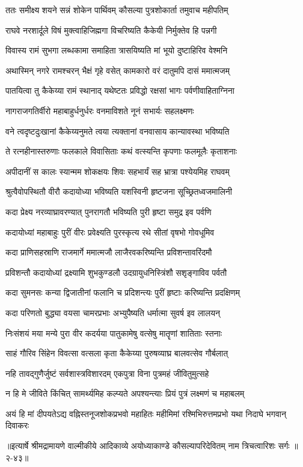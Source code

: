 
\twolineshloka
{ततः समीक्ष्य शयने सन्नं शोकेन पार्थिवम्}
{कौसल्या पुत्रशोकार्ता तमुवाच महीपतिम्} %

\twolineshloka
{राघवे नरशार्दूले विषं मुक्त्वाहिजिह्मगा}
{विचरिष्यति कैकेयी निर्मुक्तेव हि पन्नगी} %

\twolineshloka
{विवास्य रामं सुभगा लब्धकामा समाहिता}
{त्रासयिष्यति मां भूयो दुष्टाहिरिव वेश्मनि} %

\twolineshloka
{अथास्मिन् नगरे रामश्चरन् भैक्षं गृहे वसेत्}
{कामकारो वरं दातुमपि दासं ममात्मजम्} %

\twolineshloka
{पातयित्वा तु कैकेय्या रामं स्थानाद् यथेष्टतः}
{प्रविद्धो रक्षसां भागः पर्वणीवाहिताग्निना} %

\twolineshloka
{नागराजगतिर्वीरो महाबाहुर्धनुर्धरः}
{वनमाविशते नूनं सभार्यः सहलक्ष्मणः} %

\twolineshloka
{वने त्वदृष्टदुःखानां कैकेय्यनुमते त्वया}
{त्यक्तानां वनवासाय कान्यावस्था भविष्यति} %

\twolineshloka
{ते रत्नहीनास्तरुणाः फलकाले विवासिताः}
{कथं वत्स्यन्ति कृपणाः फलमूलैः कृताशनाः} %

\twolineshloka
{अपीदानीं स कालः स्यान्मम शोकक्षयः शिवः}
{सहभार्यं सह भ्रात्रा पश्येयमिह राघवम्} %

\twolineshloka
{श्रुत्वैवोपस्थितौ वीरौ कदायोध्या भविष्यति}
{यशस्विनी हृष्टजना सूच्छ्रितध्वजमालिनी} %

\twolineshloka
{कदा प्रेक्ष्य नरव्याघ्रावरण्यात् पुनरागतौ}
{भविष्यति पुरी हृष्टा समुद्र इव पर्वणि} %

\twolineshloka
{कदायोध्यां महाबाहुः पुरीं वीरः प्रवेक्ष्यति}
{पुरस्कृत्य रथे सीतां वृषभो गोवधूमिव} %

\twolineshloka
{कदा प्राणिसहस्राणि राजमार्गे ममात्मजौ}
{लाजैरवकरिष्यन्ति प्रविशन्तावरिंदमौ} %

\twolineshloka
{प्रविशन्तौ कदायोध्यां द्रक्ष्यामि शुभकुण्डलौ}
{उदग्रायुधनिस्त्रिंशौ सशृङ्गाविव पर्वतौ} %

\twolineshloka
{कदा सुमनसः कन्या द्विजातीनां फलानि च}
{प्रदिशन्त्यः पुरीं हृष्टाः करिष्यन्ति प्रदक्षिणम्} %

\twolineshloka
{कदा परिणतो बुद्ध्या वयसा चामरप्रभाः}
{अभ्युपैष्यति धर्मात्मा सुवर्ष इव लालयन्} %

\twolineshloka
{निःसंशयं मया मन्ये पुरा वीर कदर्यया}
{पातुकामेषु वत्सेषु मातॄणां शातिताः स्तनाः} %

\twolineshloka
{साहं गौरिव सिंहेन विवत्सा वत्सला कृता}
{कैकेय्या पुरुषव्याघ्र बालवत्सेव गौर्बलात्} %

\twolineshloka
{नहि तावद्गुणैर्जुष्टं सर्वशास्त्रविशारदम्}
{एकपुत्रा विना पुत्रमहं जीवितुमुत्सहे} %

\twolineshloka
{न हि मे जीविते किंचित् सामर्थ्यमिह कल्प्यते}
{अपश्यन्त्याः प्रियं पुत्रं लक्ष्मणं च महाबलम्} %

\twolineshloka
{अयं हि मां दीपयतेऽद्य वह्निस्तनूजशोकप्रभवो महाहितः}
{महीमिमां रश्मिभिरुत्तमप्रभो यथा निदाघे भगवान् दिवाकरः} %


॥इत्यार्षे श्रीमद्रामायणे वाल्मीकीये आदिकाव्ये अयोध्याकाण्डे कौसल्यापरिदेवितम् नाम त्रिचत्वारिशः सर्गः ॥२-४३॥

